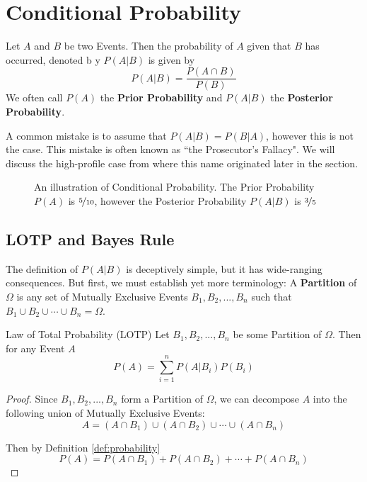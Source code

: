 \documentclass{report}
\begin{document}
\section{Conditional Probability}
Let $A$ and $B$ be two Events. Then the probability of $A$ given that $B$ has occurred, denoted b y $P(A\vert B)$ is given by
\[
    P(A\vert B)=\frac{P(A\cap B)}{P(B)}
\]
We often call $P(A)$ the \textbf{Prior Probability} and $P(A\vert B)$ the \textbf{Posterior Probability}.
\begin{notsofast}
    A common mistake is to assume that $P(A\vert B)=P(B\vert A)$, however this is not the case. This mistake is often known as ``the Prosecutor's Fallacy". We will discuss the high-profile case from where this name originated later in the section.
\end{notsofast}

\begin{figure}
    \centering
    
    \caption{An illustration of Conditional Probability. The Prior Probability $P(A)$ is $\nicefrac 5{10}$, however the Posterior Probability $P(A|B)$ is $\nicefrac 35$}
    \label{fig:dependence}
\end{figure}

\subsection{LOTP and Bayes Rule}
The definition of $P(A\vert B)$ is deceptively simple, but it has wide-ranging consequences. But first, we must establish yet more terminology: A \textbf{Partition} of $\Omega$ is any set of Mutually Exclusive Events $B_1,B_2,...,B_n$ such that $B_1\cup B_2\cup\cdots \cup B_n=\Omega$.

\begin{theorem}{Law of Total Probability (LOTP)}
Let $B_1,B_2,...,B_n$ be some Partition of $\Omega$. Then for any Event $A$
\[
    P(A)=\sum_{i=1}^n P(A\vert B_i) P(B_i)
\]
\tcblower
\begin{proof}
    Since $B_1,B_2,...,B_n$ form a Partition of $\Omega$, we can decompose $A$ into the following union of Mutually Exclusive Events:
    \[
        A=(A\cap B_1)\cup (A\cap B_2) \cup \cdots \cup (A\cap B_n)
    \]
    \begin{center}
        
    \end{center}
    Then by Definition \ref{def:probability}
    \[
        P(A)=P(A\cap B_1)+ P(A\cap B_2)+ \cdots + P(A\cap B_n)
    \]
\end{proof}
\end{theorem}
\end{document}
